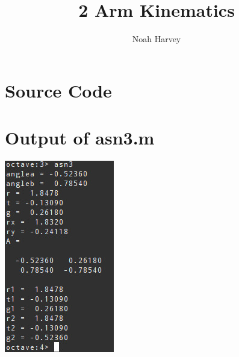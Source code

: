 \documentclass{article}
\begin{document}
\title{2 Arm Kinematics}
\author{Noah Harvey}
\maketitle
\section*{Source Code}



\section*{Output of asn3.m}
\includegraphics{asn3out.jpg}
\end{document}
